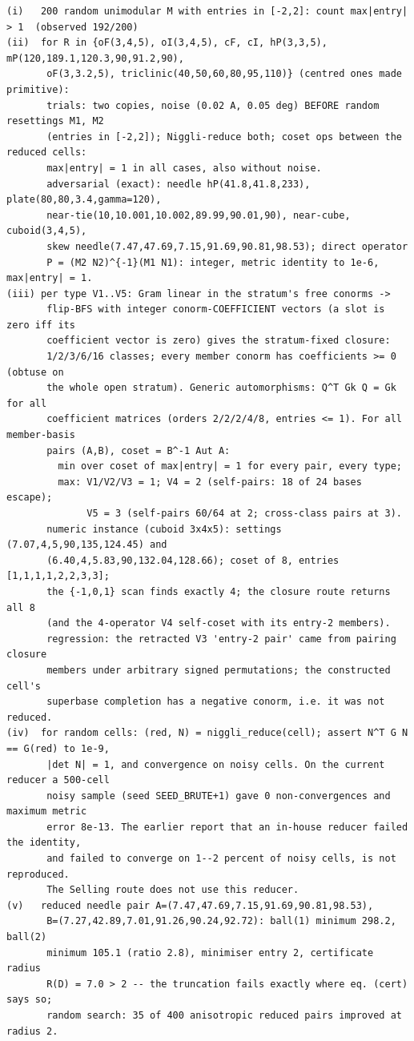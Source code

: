 \documentclass[11pt]{article}
\begin{document}
\begin{footnotesize}\begin{verbatim}
(i)   200 random unimodular M with entries in [-2,2]: count max|entry| > 1  (observed 192/200)
(ii)  for R in {oF(3,4,5), oI(3,4,5), cF, cI, hP(3,3,5), mP(120,189.1,120.3,90,91.2,90),
       oF(3,3.2,5), triclinic(40,50,60,80,95,110)} (centred ones made primitive):
       trials: two copies, noise (0.02 A, 0.05 deg) BEFORE random resettings M1, M2
       (entries in [-2,2]); Niggli-reduce both; coset ops between the reduced cells:
       max|entry| = 1 in all cases, also without noise.
       adversarial (exact): needle hP(41.8,41.8,233), plate(80,80,3.4,gamma=120),
       near-tie(10,10.001,10.002,89.99,90.01,90), near-cube, cuboid(3,4,5),
       skew needle(7.47,47.69,7.15,91.69,90.81,98.53); direct operator
       P = (M2 N2)^{-1}(M1 N1): integer, metric identity to 1e-6, max|entry| = 1.
(iii) per type V1..V5: Gram linear in the stratum's free conorms ->
       flip-BFS with integer conorm-COEFFICIENT vectors (a slot is zero iff its
       coefficient vector is zero) gives the stratum-fixed closure:
       1/2/3/6/16 classes; every member conorm has coefficients >= 0 (obtuse on
       the whole open stratum). Generic automorphisms: Q^T Gk Q = Gk for all
       coefficient matrices (orders 2/2/2/4/8, entries <= 1). For all member-basis
       pairs (A,B), coset = B^-1 Aut A:
         min over coset of max|entry| = 1 for every pair, every type;
         max: V1/V2/V3 = 1; V4 = 2 (self-pairs: 18 of 24 bases escape);
              V5 = 3 (self-pairs 60/64 at 2; cross-class pairs at 3).
       numeric instance (cuboid 3x4x5): settings (7.07,4,5,90,135,124.45) and
       (6.40,4,5.83,90,132.04,128.66); coset of 8, entries [1,1,1,1,2,2,3,3];
       the {-1,0,1} scan finds exactly 4; the closure route returns all 8
       (and the 4-operator V4 self-coset with its entry-2 members).
       regression: the retracted V3 'entry-2 pair' came from pairing closure
       members under arbitrary signed permutations; the constructed cell's
       superbase completion has a negative conorm, i.e. it was not reduced.
(iv)  for random cells: (red, N) = niggli_reduce(cell); assert N^T G N == G(red) to 1e-9,
       |det N| = 1, and convergence on noisy cells. On the current reducer a 500-cell
       noisy sample (seed SEED_BRUTE+1) gave 0 non-convergences and maximum metric
       error 8e-13. The earlier report that an in-house reducer failed the identity,
       and failed to converge on 1--2 percent of noisy cells, is not reproduced.
       The Selling route does not use this reducer.
(v)   reduced needle pair A=(7.47,47.69,7.15,91.69,90.81,98.53),
       B=(7.27,42.89,7.01,91.26,90.24,92.72): ball(1) minimum 298.2, ball(2)
       minimum 105.1 (ratio 2.8), minimiser entry 2, certificate radius
       R(D) = 7.0 > 2 -- the truncation fails exactly where eq. (cert) says so;
       random search: 35 of 400 anisotropic reduced pairs improved at radius 2.
\end{verbatim}\end{footnotesize}
\end{document}
